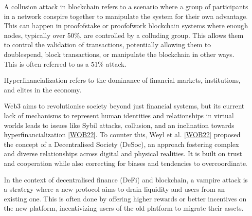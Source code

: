 \documentclass[letterpaper,10pt,english]{jupyterBook}
\begin{document}
\begin{sphinxShadowBox}

\sphinxAtStartPar
A collusion attack in blockchain refers to a scenario where a group of participants in a network conspire together to manipulate the system for their own advantage. This can happen in proof\sphinxhyphen{}of\sphinxhyphen{}stake or proof\sphinxhyphen{}of\sphinxhyphen{}work blockchain systems where enough nodes, typically over 50\%, are controlled by a colluding group. This allows them to control the validation of transactions, potentially allowing them to double\sphinxhyphen{}spend, block transactions, or manipulate the blockchain in other ways. This is often referred to as a 51\% attack.
\end{sphinxShadowBox}

\begin{sphinxShadowBox}

\sphinxAtStartPar
Hyper\sphinxhyphen{}financialization refers to the dominance of financial markets, institutions, and elites in the economy.
\end{sphinxShadowBox}

\sphinxAtStartPar
Web3 aims to revolutionise society beyond just financial systems, but its current lack of mechanisms to represent human identities and relationships in virtual worlds leads to issues like Sybil attacks, collusion, and an inclination towards hyper\sphinxhyphen{}financialization {[}\hyperlink{cite.SBT/SBT:id86}{WOB22}{]}. To counter this, Weyl et al. {[}\hyperlink{cite.SBT/SBT:id86}{WOB22}{]} proposed the concept of a Decentralised Society (DeSoc), an approach fostering complex and diverse relationships across digital and physical realities. It is built on trust and cooperation while also correcting for biases and tendencies to overcoordinate.

\begin{sphinxShadowBox}

\sphinxAtStartPar
In the context of decentralised finance (DeFi) and blockchain, a vampire attack is a strategy where a new protocol aims to drain liquidity and users from an existing one. This is often done by offering higher rewards or better incentives on the new platform, incentivizing users of the old platform to migrate their assets.
\end{sphinxShadowBox}
\end{document}
